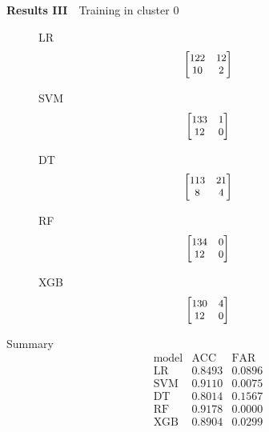 \documentclass[12pt,aspectratio=43]{beamer}
\begin{document}
\begin{frame}{\textbf{Results III}　{Training in cluster 0}}
\linespread{0.9}
{\small
\begin{figure}[h]
\centering

\begin{minipage}{0.28\linewidth}
\raggedright
{\small LR}
$$
\small
\begin{bmatrix}
122 & 12 \\
10  & 2
\end{bmatrix}
$$
\end{minipage}
\begin{minipage}{0.28\linewidth}
\raggedright
{\small SVM}
$$
\small
\begin{bmatrix}
133 & 1 \\
12  & 0
\end{bmatrix}
$$
\end{minipage}
\begin{minipage}{0.28\linewidth}
\raggedright
{\small DT}
$$
\small
\begin{bmatrix}
113 & 21 \\
8  & 4
\end{bmatrix}
$$
\end{minipage}

\vspace{0.5em}

\begin{minipage}{0.28\linewidth}
\raggedright
{\small RF}
$$
\small
\begin{bmatrix}
134 & 0 \\
12  & 0
\end{bmatrix}
$$
\end{minipage}
\begin{minipage}{0.28\linewidth}
\raggedright
{\small XGB}
$$
\small
\begin{bmatrix}
130 & 4 \\
12  & 0
\end{bmatrix}
$$
\end{minipage}

\end{figure}
}

{\small
Summary
$$
\begin{array}{l|cc}
\text{model} & \text{ACC} & \text{FAR} \\
\hline
\text{LR} & 0.8493 & 0.0896 \\
\text{SVM} & 0.9110 & 0.0075 \\
\text{DT} & 0.8014 & 0.1567 \\
\text{RF} & 0.9178 & 0.0000 \\
\text{XGB} & 0.8904 & 0.0299 \\
\end{array}
$$
}

\end{frame}
\end{document}

